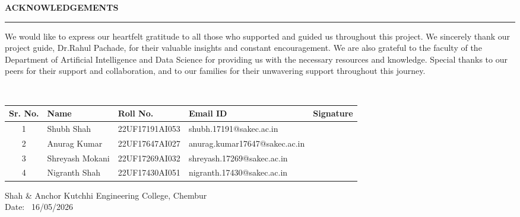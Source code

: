 \thispagestyle{empty}

\begin{center}
{\Large {\bf \uppercase{Acknowledgements}}}
\end{center}

\vspace{\baselineskip}
\hrule
\vspace{2\baselineskip}

We would like to express our heartfelt gratitude to all those who supported and guided us throughout this project. We sincerely thank our project guide, Dr.Rahul Pachade, for their valuable insights and constant encouragement. We are also grateful to the faculty of the Department of Artificial Intelligence and Data Science for providing us with the necessary resources and knowledge. Special thanks to our peers for their support and collaboration, and to our families for their unwavering support throughout this journey.

\bigskip

\bigskip

\noindent
\vspace{\baselineskip} \\
\begin{table}[htbp]
\begin{tabular}{|c|l|l|l|l|}
\hline
\textbf{Sr. No.} & \textbf{Name} & \textbf{Roll No.} & \textbf{Email ID}  & Signature\\ \hline
1 & Shubh Shah& 22UF17191AI053& shubh.17191@sakec.ac.in&\\ \hline
2 & Anurag Kumar& 22UF17647AI027& anurag.kumar17647@sakec.ac.in&\\ \hline
3 & Shreyash Mokani& 22UF17269AI032& shreyash.17269@sakec.ac.in&\\ \hline
4 & Nigranth Shah& 22UF17430AI051& nigranth.17430@sakec.ac.in&\\ \hline
\end{tabular}
\end{table}

\noindent
Shah \& Anchor Kutchhi Engineering College, Chembur \\
Date: \ 16/05/2026